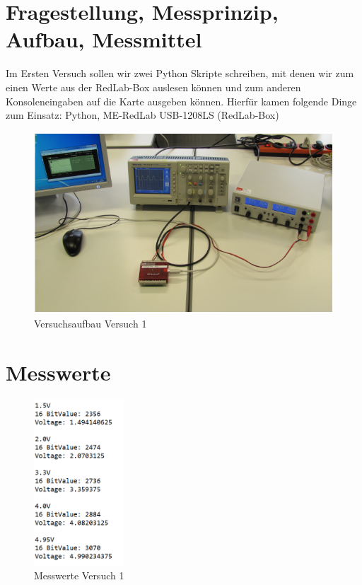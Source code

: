 \documentclass[12pt, oneside, a4paper, \docLanguage]{report}
\begin{document}
\section{Fragestellung, Messprinzip, Aufbau, Messmittel}
\label{chap:VERSUCH_1_FRAGESTELLUNG}
\begin{normalsize}
Im Ersten Versuch sollen wir zwei Python Skripte schreiben, mit denen wir zum einen Werte aus der RedLab-Box auslesen können und zum anderen Konsoleneingaben auf die Karte ausgeben können.
Hierfür kamen folgende Dinge zum Einsatz: Python, ME-RedLab USB-1208LS (RedLab-Box)
\begin{figure}[H]
	\centering
	\includegraphics[width=1\textwidth]{../Images/aufbauVersuch1.png}
	\caption{Versuchsaufbau Versuch 1}
\end{figure}
\end{normalsize}

\section{Messwerte}
\label{chap:VERSUCH_1_MESSWERTE}
\begin{normalsize}
\begin{figure}[H]
	\centering
	\includegraphics[width=0.3\textwidth]{../Images/messwerteVersuch1.png}
	\caption{Messwerte Versuch 1}
\end{figure}
\end{normalsize}
	
\end{document}
